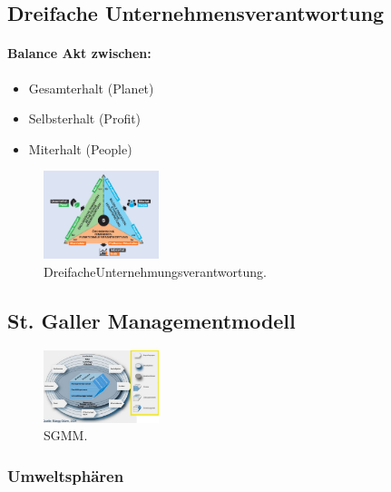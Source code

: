 \documentclass{article}
\begin{document}
\subsection{Dreifache Unternehmensverantwortung}
\paragraph{Balance Akt zwischen:} 

\begin{itemize}
\item Gesamterhalt (Planet)
\item Selbsterhalt (Profit)
\item Miterhalt (People)
\end{itemize}

\begin{figure}[H]
\centering
\includegraphics[width=0.3\textwidth]{Resources/Image/Dreifache Unternehmungsveratntwortung.png}
\caption{\label{fig:DreifacheUnternehmungsverantwortung}DreifacheUnternehmungsverantwortung.}
\end{figure}


\subsection{St. Galler Managementmodell}
\begin{figure}[H]
\centering
\includegraphics[width=0.3\textwidth]{Resources/Image/SGMM.png}
\caption{\label{fig:SGMM}SGMM.}
\end{figure}


\subsubsection{Umweltsphären}
\end{document}
